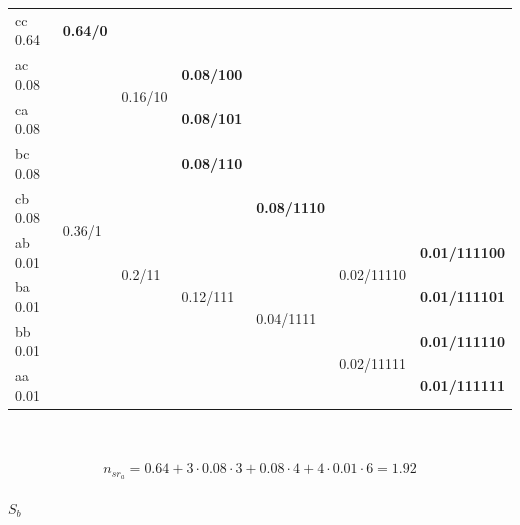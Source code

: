 \documentclass[12pt]{article}
\begin{document}
\begin{enumerate}
\begin{tabular}{|l|l|lllll}
\cline{1-2}
cc 0.64 & \textbf{0.64/0} &  &  &  &  &  \\ \cline{1-4}
ac 0.08 & \multirow{8}{*}{0.36/1} & \multicolumn{1}{l|}{\multirow{2}{*}{0.16/10}} & \multicolumn{1}{l|}{\textbf{0.08/100}} &  &  &  \\ \cline{1-1} \cline{4-4}
ca 0.08 &  & \multicolumn{1}{l|}{} & \multicolumn{1}{l|}{\textbf{0.08/101}} &  &  &  \\ \cline{1-1} \cline{3-4}
bc 0.08 &  & \multicolumn{1}{l|}{\multirow{6}{*}{0.2/11}} & \multicolumn{1}{l|}{\textbf{0.08/110}} &  &  &  \\ \cline{1-1} \cline{4-5}
cb 0.08 &  & \multicolumn{1}{l|}{} & \multicolumn{1}{l|}{\multirow{5}{*}{0.12/111}} & \multicolumn{1}{l|}{\textbf{0.08/1110}} &  &  \\ \cline{1-1} \cline{5-7} 
ab 0.01 &  & \multicolumn{1}{l|}{} & \multicolumn{1}{l|}{} & \multicolumn{1}{l|}{\multirow{4}{*}{0.04/1111}} & \multicolumn{1}{l|}{\multirow{2}{*}{0.02/11110}} & \multicolumn{1}{l|}{\textbf{0.01/111100}} \\ \cline{1-1} \cline{7-7} 
ba 0.01 &  & \multicolumn{1}{l|}{} & \multicolumn{1}{l|}{} & \multicolumn{1}{l|}{} & \multicolumn{1}{l|}{} & \multicolumn{1}{l|}{\textbf{0.01/111101}} \\ \cline{1-1} \cline{6-7} 
bb 0.01 &  & \multicolumn{1}{l|}{} & \multicolumn{1}{l|}{} & \multicolumn{1}{l|}{} & \multicolumn{1}{l|}{\multirow{2}{*}{0.02/11111}} & \multicolumn{1}{l|}{\textbf{0.01/111110}} \\ \cline{1-1} \cline{7-7} 
aa 0.01 &  & \multicolumn{1}{l|}{} & \multicolumn{1}{l|}{} & \multicolumn{1}{l|}{} & \multicolumn{1}{l|}{} & \multicolumn{1}{l|}{\textbf{0.01/111111}} \\ \hline
\end{tabular}

\\
\\
\begin{equation*}
    n_{sr_{a}} = 0.64 + 3\cdot0.08\cdot3 + 0.08\cdot4 + 4\cdot0.01\cdot6=1.92
\end{equation*}
\\
$S_b$
\\


\end{enumerate}
\end{document}
